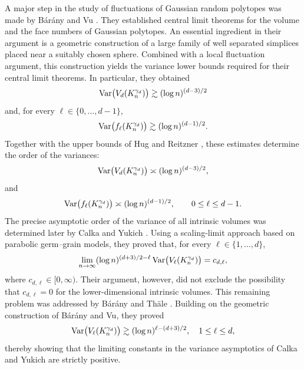 \documentclass[10pt]{amsart}
\newcommand{\1}{\textbf{1}}
\newcommand{\Var}{{\rm Var}}
\numberwithin{equation}{section} %
\theoremstyle{remark}
\theoremstyle{definition}
\begin{document}
A major step in the study of fluctuations of Gaussian random polytopes was
made by B\'ar\'any and Vu \cite{Bar-Vu}. They established central limit
theorems for the volume and the face numbers of Gaussian polytopes. An
essential ingredient in their argument is a geometric construction of a
large family of well separated simplices placed near a suitably chosen sphere. Combined with a
local fluctuation argument, this construction yields the variance lower
bounds required for their central limit theorems. In particular, they
obtained
\[
    \Var\bigl(V_d(K_n^{\gamma_d})\bigr)
    \gtrsim
    (\log n)^{(d-3)/2}
\]
and, for every $\ell\in\{0,\ldots,d-1\}$,
\[
    \Var\bigl(f_\ell(K_n^{\gamma_d})\bigr)
    \gtrsim
    (\log n)^{(d-1)/2}.
\] Together with the upper bounds of Hug and Reitzner \cite{Hug-Rei}, these
estimates determine the order of the variances:
\[
    \Var\bigl(V_d(K_n^{\gamma_d})\bigr)
    \asymp
    (\log n)^{(d-3)/2},
\]
and
\[
    \Var\bigl(f_\ell(K_n^{\gamma_d})\bigr)
    \asymp
    (\log n)^{(d-1)/2},
    \qquad 0\leq \ell\leq d-1.
\]
The precise asymptotic order of the variance of all intrinsic volumes was
determined later by Calka and Yukich \cite{Cal-Yuk}. Using a scaling-limit approach based on parabolic germ--grain models, they proved that, for every
$\ell\in\{1,\ldots,d\}$,
\[
    \lim_{n\to\infty}
    (\log n)^{(d+3)/2-\ell}
    \,\Var\bigl(V_\ell(K_n^{\gamma_d})\bigr)
    =c_{d,\ell},
\]
where $c_{d,\ell}\in[0,\infty)$. Their argument, however, did not exclude the
possibility that $c_{d,\ell}=0$ for the lower-dimensional intrinsic volumes.
This remaining problem was addressed by B\'ar\'any and Th\"ale
\cite{Bar-Th}. Building on the geometric construction of B\'ar\'any and Vu,
they proved
\[
    \Var\bigl(V_\ell(K_n^{\gamma_d})\bigr)
    \gtrsim
    (\log n)^{\ell-(d+3)/2},
    \quad 1\leq\ell\leq d,
\]
thereby showing that the limiting constants in the variance asymptotics of
Calka and Yukich are strictly positive.
\end{document}
